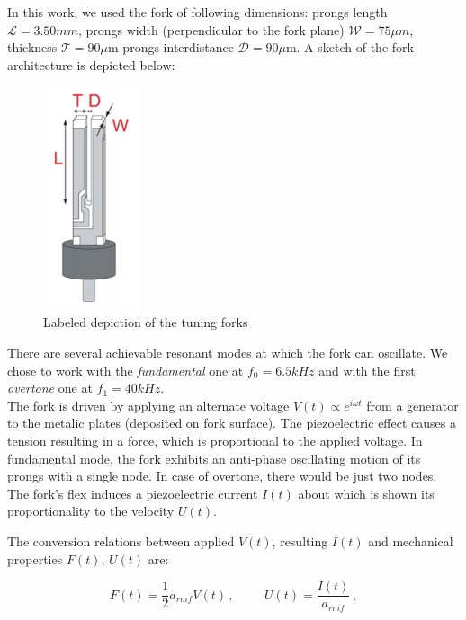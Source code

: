 In this work, we used the fork of following dimensions: prongs length $ \mathcal{L} = 3.50\unit{mm} $, prongs width (perpendicular to the fork plane) $ \mathcal{W}=75 \mu\unit{m} $, thickness $ \mathcal{T}=90\mu\text{m} $ prongs interdistance $ \mathcal{D}=90\mu\text{m} $. A sketch of the fork architecture is depicted below:

\begin{figure}[h]
	\centering
	\includegraphics[width=0.25\textwidth]{graphics/exp/quartz}
	\caption{Labeled depiction of the tuning forks}
\end{figure}

There are several achievable resonant modes at which the fork can oscillate. We chose to work with the \textit{fundamental} one at $f_0 = 6.5 \unit{kHz}$ and with the first \textit{overtone} one at $f_1 = 40 \unit{kHz}$.\\
The fork is driven by applying an alternate voltage $V(t) \propto e^{i\omega t}$ from a generator to the metalic plates (deposited on fork surface). The piezoelectric effect causes a tension resulting in a force, which is proportional to the applied voltage. In fundamental mode, the fork exhibits an anti-phase oscillating motion of its prongs with a single node. In case of overtone, there would be just two nodes. The fork's flex induces a piezoelectric current $I(t)$ about which is shown its proportionality to the velocity $U(t)$.

The conversion relations between applied $V(t)$, resulting $I(t)$ and mechanical properties $F(t)$, $U(t)$ are:

\begin{equation}
F(t) = \frac{1}{2} a_{rmf} V(t)\,,
\hspace{1cm}
U(t) = \frac{I(t)}{a_{rmf}}\,,
\end{equation}

